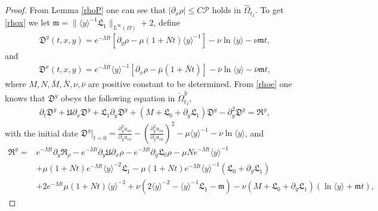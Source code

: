 \documentclass{amsart}
\numberwithin{equation}{section}
\newcommand\y{{{\langle y \rangle}}}
\begin{document}
\begin{proof}
From Lemma \ref{rhoP} one can see that $|\partial_{x}\rho|\leq C\mathcal{P}$ holds in $\hat{\Omega}_{t_{2}}$. To get \eqref{rhox} we let $\mathfrak{m}=\|\y^{-1}\mathfrak{L}_{1}\|_{L^{\infty}(\Omega)}+2$, define
\begin{align*}
\mathfrak{D}^{y}(t,x,y)=e^{-Mt}[\partial_{y}\rho-\mu(1+Nt)\y^{-1}]-\nu\ln\y-\nu \mathfrak{m}t,
\end{align*}
and
\begin{align*}
\mathfrak{D}^{x}(t,x,y)=e^{-\bar{M}t}\y^{-1}[\partial_{x}\rho-\bar{\mu}(1+\bar{N}t)]-\bar{\nu}\ln\y-\bar{\nu}\mathfrak{m}t,
\end{align*}
where $M,N,\bar{M},\bar{N},\nu,\bar{\nu}$ are positive constant to be determined. From \eqref{rhoe} one knows that $\mathfrak{D}^{y}$ obeys the following equation in $\check{\Omega}_{t_{2}}^{\hat{y}}$,
\begin{align*}
\partial_{t}\mathfrak{D}^{y}
+\mathfrak{U}\partial_{x}\mathfrak{D}^{y}
+\mathfrak{L}_{1}\partial_{y}\mathfrak{D}^{y}
+(M+\mathfrak{L}_{0}+\partial_{y}\mathfrak{L}_{1})\mathfrak{D}^{y}
-\partial_{y}^{2}\mathfrak{D}^{y}
=\mathfrak{R}^{y},
\end{align*}
with the initial date
$\mathfrak{D}^{y}|_{t=0}=\frac{\partial_{y}^{3}u_{in}}{\partial_{y}u_{in}}-\left(\frac{\partial_{y}^{2}u_{in}}{\partial_{y}u_{in}}\right)^{2}
-\mu\y^{-1}-\nu\ln\y$, and
\begin{align*}
\mathfrak{R}^{y}=& e^{-Mt}\partial_{y}\mathfrak{R}_{\rho}
  -e^{-Mt}\partial_{y}\mathfrak{U}\partial_{x}\rho
  -e^{-Mt}\partial_{y}\mathfrak{L}_{0}\rho
  -\mu Ne^{-Mt}\y^{-1}\\
 &+\mu(1+Nt)e^{-Mt}\y^{-2}\mathfrak{L}_{1}
  -\mu(1+Nt)e^{-Mt}\y^{-1}(\mathfrak{L}_{0}+\partial_{y}\mathfrak{L}_{1})\\
 &+2e^{-Mt}\mu(1+Nt)\y^{-3}
  +\nu(2\y^{-2}-\y^{-1}\mathfrak{L}_{1}-\mathfrak{m})
  -\nu(M+\mathfrak{L}_{0}+\partial_{y}\mathfrak{L}_{1})(\ln\y+\mathfrak{m}t),
\end{align*}


\end{proof}
\end{document}
